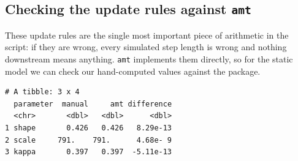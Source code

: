 \documentclass[
  letterpaper,
  DIV=11,
  numbers=noendperiod]{scrartcl}
\newenvironment{Shaded}{\begin{snugshade}}{\end{snugshade}}
\newcommand{\AttributeTok}[1]{\textcolor[rgb]{0.40,0.45,0.13}{#1}}
\newcommand{\DecValTok}[1]{\textcolor[rgb]{0.68,0.00,0.00}{#1}}
\newcommand{\FunctionTok}[1]{\textcolor[rgb]{0.28,0.35,0.67}{#1}}
\newcommand{\NormalTok}[1]{\textcolor[rgb]{0.00,0.23,0.31}{#1}}
\newcommand{\OtherTok}[1]{\textcolor[rgb]{0.00,0.23,0.31}{#1}}
\newcommand{\SpecialCharTok}[1]{\textcolor[rgb]{0.37,0.37,0.37}{#1}}
\newcommand{\StringTok}[1]{\textcolor[rgb]{0.13,0.47,0.30}{#1}}
\begin{document}
\subsection{\texorpdfstring{Checking the update rules against
\texttt{amt}}{Checking the update rules against amt}}\label{checking-the-update-rules-against-amt}

These update rules are the single most important piece of arithmetic in
the script: if they are wrong, every simulated step length is wrong and
nothing downstream means anything. \texttt{amt} implements them
directly, so for the static model we can check our hand-computed values
against the package.

\begin{Shaded}
\end{Shaded}

\begin{verbatim}
# A tibble: 3 x 4
  parameter  manual     amt difference
  <chr>       <dbl>   <dbl>      <dbl>
1 shape       0.426   0.426   8.29e-13
2 scale     791.    791.      4.68e- 9
3 kappa       0.397   0.397  -5.11e-13
\end{verbatim}
\end{document}
